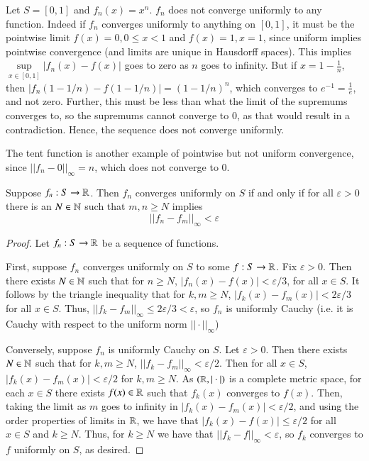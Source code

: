 \begin{example}
    Let $S = [0,1]$ and $f_n(x) = x^n$. $f_n$ does not converge uniformly to any function. Indeed if $f_n$ converges uniformly to anything on $[0,1]$, it must be the pointwise limit $f(x) = 0, 0 \leq x < 1$ and $f(x) = 1, x =1$, since uniform implies pointwise convergence (and limits are unique in Hausdorff spaces). This implies $\sup\limits_{x \in [0,1]}|f_n(x) - f(x)|$ goes to zero as $n$ goes to infinity. But if $x = 1-\frac{1}{n}$, then $|f_n(1-1/n)-f(1-1/n)| = (1-1/n)^n$, which converges to $e^{-1} = \frac{1}{e}$, and not zero. Further, this must be less than what the limit of the supremums converges to, so the supremums cannot converge to $0$, as that would result in a contradiction. Hence, the sequence does not converge uniformly.
\end{example}

The tent function is another example of pointwise but not uniform convergence, since $||f_n-0||_{\infty} = n$, which does not converge to $0$. 

\begin{theorem}
    Suppose $f_n:S\rightarrow \mathbb R$. Then $f_n$ converges uniformly on $S$ if and only if for all $\varepsilon > 0$ there is an $N \in \mathbb N$ such that $m,n \geq N$ implies $$||f_n - f_m||_{\infty} < \varepsilon$$
\end{theorem}
\begin{proof}
    Let $f_n:S\rightarrow \mathbb R$ be a sequence of functions.

    First, suppose $f_n$ converges uniformly on $S$ to some $f:S\rightarrow \mathbb R$. Fix $\varepsilon > 0$. Then there exists $N \in \mathbb N$ such that for $n \geq N$, $|f_n(x) - f(x)| < \varepsilon/3$, for all $x \in S$. It follows by the triangle inequality that for $k,m \geq N$, $|f_k(x) - f_m(x)| < 2\varepsilon/3$ for all $x \in S$. Thus, $||f_k - f_m||_{\infty} \leq 2\varepsilon/3 < \varepsilon$, so $f_n$ is uniformly Cauchy (i.e. it is Cauchy with respect to the uniform norm $||\cdot||_{\infty}$)

    Conversely, suppose $f_n$ is uniformly Cauchy on $S$. Let $\varepsilon > 0$. Then there exists $N \in \mathbb N$ such that for $k,m \geq N$, $||f_k - f_m||_{\infty} < \varepsilon/2$. Then for all $x \in S$, $|f_k(x) - f_m(x)| < \varepsilon/2$ for $k,m \geq N$. As $(\mathbb R, |\cdot|)$ is a complete metric space, for each $x \in S$ there exists $f(x) \in \mathbb R$ such that $f_k(x)$ converges to $f(x)$. Then, taking the limit as $m$ goes to infinity in $|f_k(x) - f_m(x)| < \varepsilon/2$, and using the order properties of limits in $\mathbb R$, we have that $|f_k(x) - f(x)| \leq \varepsilon/2$ for all $x \in S$ and $k \geq N$. Thus, for $k \geq N$ we have that $||f_k - f||_{\infty} < \varepsilon$, so $f_k$ converges to $f$ uniformly on $S$, as desired.
\end{proof}


